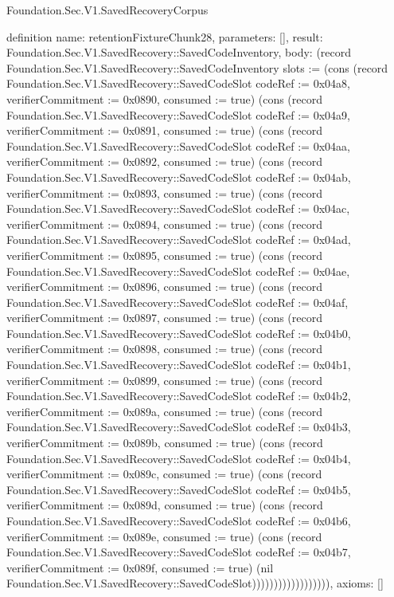 \begin{lexlean}{Foundation.Sec.V1.SavedRecoveryCorpus}
\begin{semanticmodule}
definition{
  name: retentionFixtureChunk28,
  parameters: [],
  result: Foundation.Sec.V1.SavedRecovery::SavedCodeInventory,
  body: (record Foundation.Sec.V1.SavedRecovery::SavedCodeInventory {slots := (cons (record Foundation.Sec.V1.SavedRecovery::SavedCodeSlot {codeRef := 0x04a8, verifierCommitment := 0x0890, consumed := true}) (cons (record Foundation.Sec.V1.SavedRecovery::SavedCodeSlot {codeRef := 0x04a9, verifierCommitment := 0x0891, consumed := true}) (cons (record Foundation.Sec.V1.SavedRecovery::SavedCodeSlot {codeRef := 0x04aa, verifierCommitment := 0x0892, consumed := true}) (cons (record Foundation.Sec.V1.SavedRecovery::SavedCodeSlot {codeRef := 0x04ab, verifierCommitment := 0x0893, consumed := true}) (cons (record Foundation.Sec.V1.SavedRecovery::SavedCodeSlot {codeRef := 0x04ac, verifierCommitment := 0x0894, consumed := true}) (cons (record Foundation.Sec.V1.SavedRecovery::SavedCodeSlot {codeRef := 0x04ad, verifierCommitment := 0x0895, consumed := true}) (cons (record Foundation.Sec.V1.SavedRecovery::SavedCodeSlot {codeRef := 0x04ae, verifierCommitment := 0x0896, consumed := true}) (cons (record Foundation.Sec.V1.SavedRecovery::SavedCodeSlot {codeRef := 0x04af, verifierCommitment := 0x0897, consumed := true}) (cons (record Foundation.Sec.V1.SavedRecovery::SavedCodeSlot {codeRef := 0x04b0, verifierCommitment := 0x0898, consumed := true}) (cons (record Foundation.Sec.V1.SavedRecovery::SavedCodeSlot {codeRef := 0x04b1, verifierCommitment := 0x0899, consumed := true}) (cons (record Foundation.Sec.V1.SavedRecovery::SavedCodeSlot {codeRef := 0x04b2, verifierCommitment := 0x089a, consumed := true}) (cons (record Foundation.Sec.V1.SavedRecovery::SavedCodeSlot {codeRef := 0x04b3, verifierCommitment := 0x089b, consumed := true}) (cons (record Foundation.Sec.V1.SavedRecovery::SavedCodeSlot {codeRef := 0x04b4, verifierCommitment := 0x089c, consumed := true}) (cons (record Foundation.Sec.V1.SavedRecovery::SavedCodeSlot {codeRef := 0x04b5, verifierCommitment := 0x089d, consumed := true}) (cons (record Foundation.Sec.V1.SavedRecovery::SavedCodeSlot {codeRef := 0x04b6, verifierCommitment := 0x089e, consumed := true}) (cons (record Foundation.Sec.V1.SavedRecovery::SavedCodeSlot {codeRef := 0x04b7, verifierCommitment := 0x089f, consumed := true}) (nil Foundation.Sec.V1.SavedRecovery::SavedCodeSlot)))))))))))))))))}),
  axioms: []
}


\end{semanticmodule}
\end{lexlean}
